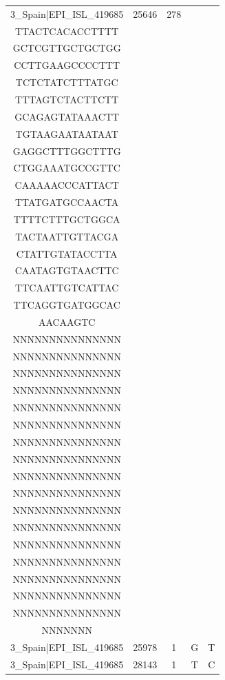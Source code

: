 \documentclass[a4paper,10pt]{article}
\begin{document}
\begin{longtable}{@{}ccccc@{}}
3\_Spain|EPI\_ISL\_419685 & 25646 & 278 & \begin{tabular}[c]{@{}c@{}}GTTGTTTGTAACAGT\\ TTACTCACACCTTTT\\ GCTCGTTGCTGCTGG\\ CCTTGAAGCCCCTTT\\ TCTCTATCTTTATGC\\ TTTAGTCTACTTCTT\\ GCAGAGTATAAACTT\\ TGTAAGAATAATAAT\\ GAGGCTTTGGCTTTG\\ CTGGAAATGCCGTTC\\ CAAAAACCCATTACT\\ TTATGATGCCAACTA\\ TTTTCTTTGCTGGCA\\ TACTAATTGTTACGA\\ CTATTGTATACCTTA\\ CAATAGTGTAACTTC\\ TTCAATTGTCATTAC\\ TTCAGGTGATGGCAC\\ AACAAGTC\end{tabular} & \begin{tabular}[c]{@{}c@{}}NNNNNNNNNNNNNNNN\\ NNNNNNNNNNNNNNN\\ NNNNNNNNNNNNNNN\\ NNNNNNNNNNNNNNN\\ NNNNNNNNNNNNNNN\\ NNNNNNNNNNNNNNN\\ NNNNNNNNNNNNNNN\\ NNNNNNNNNNNNNNN\\ NNNNNNNNNNNNNNN\\ NNNNNNNNNNNNNNN\\ NNNNNNNNNNNNNNN\\ NNNNNNNNNNNNNNN\\ NNNNNNNNNNNNNNN\\ NNNNNNNNNNNNNNN\\ NNNNNNNNNNNNNNN\\ NNNNNNNNNNNNNNN\\ NNNNNNNNNNNNNNN\\ NNNNNNNNNNNNNNN\\ NNNNNNN\end{tabular} \\* \midrule
3\_Spain|EPI\_ISL\_419685 & 25978 & 1 & G & T \\* \midrule
3\_Spain|EPI\_ISL\_419685 & 28143 & 1 & T & C \\* \midrule

\end{longtable}
\end{document}
